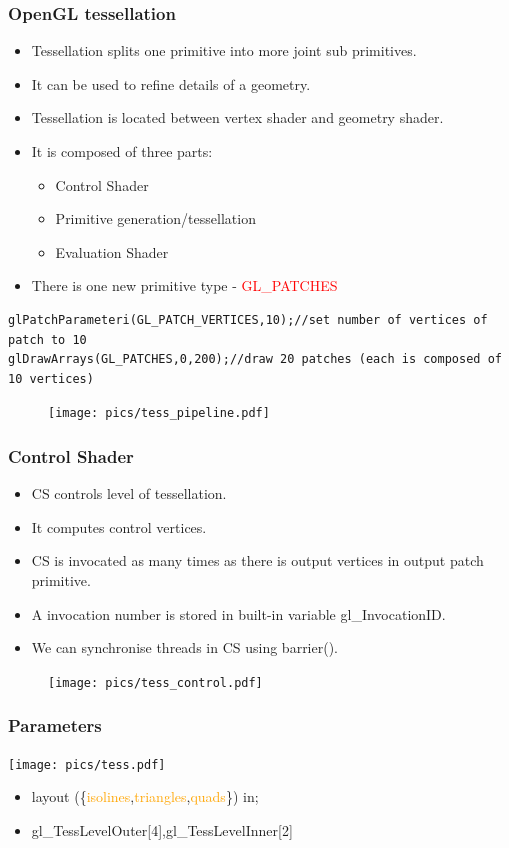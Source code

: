 \begin{frame}[fragile]
\frametitle{OpenGL tessellation}
	\begin{itemize}
	\item Tessellation splits one primitive into more joint sub primitives.
	\item It can be used to refine details of a geometry.
	\item Tessellation is located between vertex shader and geometry shader.
	\item It is composed of three parts:
	\begin{itemize}
	\item Control Shader
	\item Primitive generation/tessellation
	\item Evaluation Shader
	\end{itemize}
	\item There is one new primitive type - \textcolor{red}{GL\_PATCHES}
	\end{itemize}
  {\scriptsize
	\begin{verbatim}
glPatchParameteri(GL_PATCH_VERTICES,10);//set number of vertices of patch to 10
glDrawArrays(GL_PATCHES,0,200);//draw 20 patches (each is composed of 10 vertices)
	\end{verbatim}
  }
	\begin{figure}[h]
	\texttt{[image: pics/tess\_pipeline.pdf]}
	\end{figure}
\end{frame}

\begin{frame}
\frametitle{Control Shader}
	\begin{itemize}
	\item CS controls level of tessellation.
	\item It computes control vertices.
	\item CS is invocated as many times as there is output vertices in output patch primitive.
	\item A invocation number is stored in built-in variable \textcolor{OliveGreen}{gl\_InvocationID}.
	\item We can synchronise threads in CS using \textcolor{OliveGreen}{barrier}().
	\end{itemize}
	\begin{figure}[h]
	\texttt{[image: pics/tess\_control.pdf]}
	\end{figure}
\end{frame}

\begin{frame}
    \frametitle{Parameters}

    \texttt{[image: pics/tess.pdf]}

    \begin{itemize}
				\item \textcolor{OliveGreen}{layout}
					(\{\textcolor{orange}{isolines},\textcolor{orange}{triangles},\textcolor{orange}{quads}\})
					\textcolor{OliveGreen}{in};
				\item \textcolor{OliveGreen}{gl\_TessLevelOuter}[4],\textcolor{OliveGreen}{gl\_TessLevelInner}[2]
    \end{itemize}
\end{frame}

